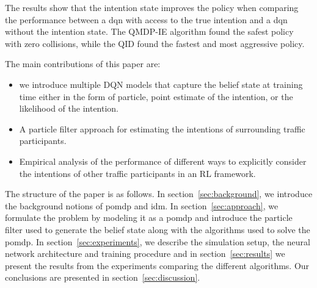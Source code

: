 	
	
	The results show that the intention state improves the policy when comparing the performance between a \gls{dqn} with access to the true intention and a \gls{dqn} without the intention state. The QMDP-IE algorithm found the safest policy with zero collisions, while the QID found the fastest and most aggressive policy.
	
	The main contributions of this paper are: 
	\begin{itemize}
		\item we introduce multiple DQN models that capture the belief state at training time either in the form of particle, point estimate of the intention, or the likelihood of the intention.
		\item A particle filter approach for estimating the intentions of surrounding traffic participants.
		\item Empirical analysis of the performance of different ways to explicitly consider the intentions of other traffic participants in an RL framework.
	
	\end{itemize}
	
	
	The structure of the paper is as follows. In section~\ref{sec:background}, we introduce the background notions of \gls{pomdp} and \gls{idm}. In section~\ref{sec:approach}, we formulate the problem by modeling it as a \gls{pomdp} and introduce the particle filter used to generate the belief state along with the algorithms used to solve the \gls{pomdp}. In section~\ref{sec:experiments}, we describe the simulation setup, the neural network architecture and training procedure and in section~\ref{sec:results} we present the results from the experiments comparing the different algorithms. Our conclusions are presented in section~\ref{sec:discussion}. 
	
